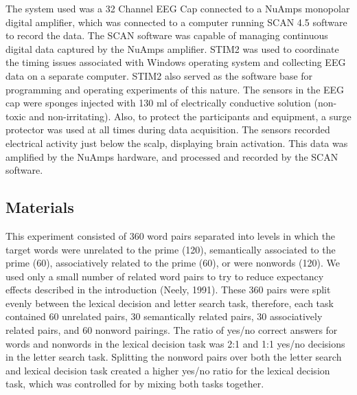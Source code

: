 \documentclass[english,man]{apa6}
\theoremstyle{definition}
\theoremstyle{definition}
\theoremstyle{definition}
\theoremstyle{remark}
\begin{document}
The system used was a 32 Channel EEG Cap connected to a NuAmps monopolar
digital amplifier, which was connected to a computer running SCAN 4.5
software to record the data. The SCAN software was capable of managing
continuous digital data captured by the NuAmps amplifier. STIM2 was used
to coordinate the timing issues associated with Windows operating system
and collecting EEG data on a separate computer. STIM2 also served as the
software base for programming and operating experiments of this nature.
The sensors in the EEG cap were sponges injected with 130 ml of
electrically conductive solution (non-toxic and non-irritating). Also,
to protect the participants and equipment, a surge protector was used at
all times during data acquisition. The sensors recorded electrical
activity just below the scalp, displaying brain activation. This data
was amplified by the NuAmps hardware, and processed and recorded by the
SCAN software.

\subsection{Materials}\label{materials}

This experiment consisted of 360 word pairs separated into levels in
which the target words were unrelated to the prime (120), semantically
associated to the prime (60), associatively related to the prime (60),
or were nonwords (120). We used only a small number of related word
pairs to try to reduce expectancy effects described in the introduction
(Neely, 1991). These 360 pairs were split evenly between the lexical
decision and letter search task, therefore, each task contained 60
unrelated pairs, 30 semantically related pairs, 30 associatively related
pairs, and 60 nonword pairings. The ratio of yes/no correct answers for
words and nonwords in the lexical decision task was 2:1 and 1:1 yes/no
decisions in the letter search task. Splitting the nonword pairs over
both the letter search and lexical decision task created a higher yes/no
ratio for the lexical decision task, which was controlled for by mixing
both tasks together.
\end{document}
